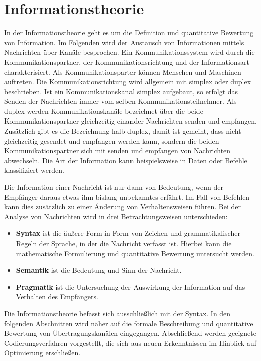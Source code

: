 \chapter{Informationstheorie}
In der Informationstheorie geht es um die Definition und quantitative Bewertung von Information. Im Folgenden wird der Austausch von Informationen mittels Nachrichten über Kanäle besprochen. Ein Kommunikationssystem wird durch die Kommunikationspartner, der Kommunikationsrichtung und der Informationsart charakterisiert. Als Kommunikationsparter können Menschen und Maschinen auftreten. Die Kommunikationsrichtung wird allgemein mit simplex oder duplex beschrieben. Ist ein Kommunikationskanal simplex aufgebaut, so erfolgt das Senden der Nachrichten immer vom selben Kommunikationsteilnehmer. Als duplex werden Kommunikationskanäle bezeichnet über die beide Kommunikationspartner gleichzeitig einander Nachrichten senden und empfangen. Zusätzlich gibt es die Bezeichnung halb-duplex, damit ist gemeint, dass nicht gleichzeitig gesendet und empfangen werden kann, sondern die beiden Kommunikationspartner sich mit senden und empfangen von Nachrichten abwechseln. Die Art der Information kann beispielsweise in Daten oder Befehle klassifiziert werden.

Die Information einer Nachricht ist nur dann von Bedeutung, wenn der Empfänger daraus etwas ihm bislang unbekanntes erfährt. Im Fall von Befehlen kann dies zusätzlich zu einer Änderung von Verhaltensweisen führen. Bei der Analyse von Nachrichten wird in drei Betrachtungsweisen unterschieden:
\begin{itemize}
  \item \textbf{Syntax} ist die äußere Form in Form von Zeichen und grammatikalischer Regeln der Sprache, in der die Nachricht verfasst ist. Hierbei kann die mathematische Formulierung und quantitative Bewertung untersucht werden.
  \item \textbf{Semantik} ist die Bedeutung und Sinn der Nachricht.
  \item \textbf{Pragmatik} ist die Untersuchung der Auswirkung der Information auf das Verhalten des Empfängers.
\end{itemize}

Die Informationstheorie befasst sich ausschließlich mit der Syntax. In den folgenden Abschnitten wird näher auf die formale Beschreibung und quantitative Bewertung von Übertragungskanälen eingegangen. Abschließend werden geeignete Codierungsverfahren vorgestellt, die sich aus neuen Erkenntnissen im Hinblick auf Optimierung erschließen.

